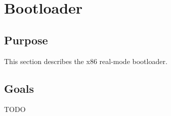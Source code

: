
\section{Bootloader}

\subsection{Purpose}

This section describes the x86 real-mode bootloader.

\subsection{Goals}

TODO
